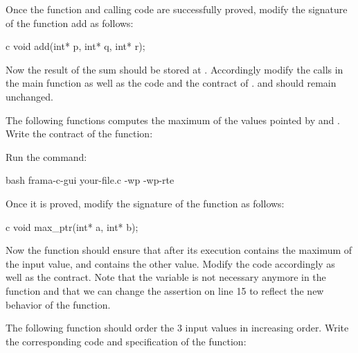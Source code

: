 Once the function and calling code are successfully proved, modify the
signature of the function add as follows:



\begin{CodeBlock}{c}
void add(int* p, int* q, int* r);
\end{CodeBlock}


Now the result of the sum should be stored at . Accordingly
modify the calls in the main function as well as the code and the contract
of .  and  should remain
unchanged.






The following functions computes the maximum of the values pointed by
 and . Write the contract of the function:






Run the command:



\begin{CodeBlock}{bash}
frama-c-gui your-file.c -wp -wp-rte
\end{CodeBlock}



Once it is proved, modify the signature of the function as follows:



\begin{CodeBlock}{c}
void max_ptr(int* a, int* b);
\end{CodeBlock}


Now the function should ensure that after its execution 
contains the maximum of the input value, and  contains the
other value. Modify the code accordingly as well as the contract. Note that
the variable  is not necessary anymore in the 
function and that we can change the assertion on line 15 to reflect the
new behavior of the function.






The following function should order the 3 input values in increasing order.
Write the corresponding code and specification of the function:


